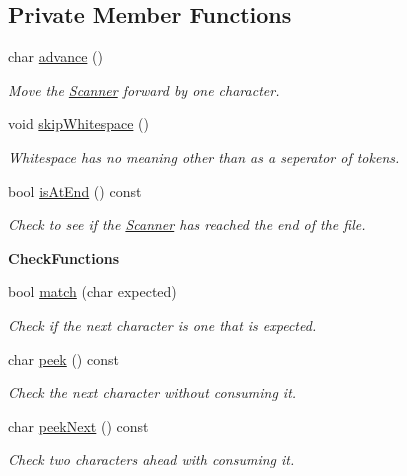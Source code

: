 \subsection*{Private Member Functions}
\begin{DoxyCompactItemize}
\item 
char \hyperlink{class_scanner_a48162dd3db322ae58745bacacd98c463}{advance} ()
\begin{DoxyCompactList}\small\item\em Move the \hyperlink{class_scanner}{Scanner} forward by one character. \end{DoxyCompactList}\item 
\mbox{\label{class_scanner_add2818e08ee85a6442a31cde8d4e20a8}} 
void \hyperlink{class_scanner_add2818e08ee85a6442a31cde8d4e20a8}{skip\+Whitespace} ()
\begin{DoxyCompactList}\small\item\em Whitespace has no meaning other than as a seperator of tokens. \end{DoxyCompactList}\item 
bool \hyperlink{class_scanner_a886d66bcf9d8edd27f46f14f6df3c144}{is\+At\+End} () const
\begin{DoxyCompactList}\small\item\em Check to see if the \hyperlink{class_scanner}{Scanner} has reached the end of the file. \end{DoxyCompactList}\end{DoxyCompactItemize}
\begin{Indent}\textbf{ Check\+Functions}\par
\begin{DoxyCompactItemize}
\item 
bool \hyperlink{class_scanner_a54cd78a16ceb924d3177f281cddd2fb6}{match} (char expected)
\begin{DoxyCompactList}\small\item\em Check if the next character is one that is expected. \end{DoxyCompactList}\item 
char \hyperlink{class_scanner_aa5a6d5cab883f737f1ac799dd3434b4f}{peek} () const
\begin{DoxyCompactList}\small\item\em Check the next character without consuming it. \end{DoxyCompactList}\item 
char \hyperlink{class_scanner_a7641b64d926934c5007c3b33191f1422}{peek\+Next} () const
\begin{DoxyCompactList}\small\item\em Check two characters ahead with consuming it. \end{DoxyCompactList}\end{DoxyCompactItemize}
\end{Indent}

